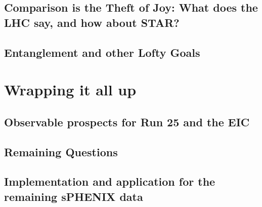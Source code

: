 \documentclass[letterpaper, 12pt, oneside]{book}
\theoremstyle{definition}
\begin{document}
\chapter{Comparison is the Theft of Joy: What does the LHC say, and how about STAR?}
\chapter{Entanglement and other Lofty Goals}
\part{Wrapping it all up}
\chapter{Observable prospects for Run 25 and the EIC}
\chapter{Remaining Questions}
\chapter{Implementation and application for the remaining sPHENIX data}
\singlespacing
\printbibliography
%
%
\end{document}
